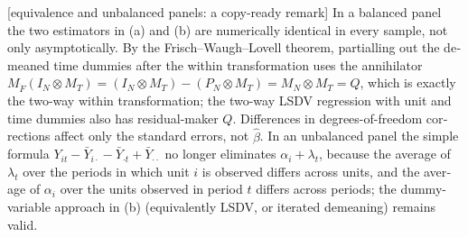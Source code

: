 \begin{english}[equivalence and unbalanced panels: a copy-ready remark]
In a balanced panel the two estimators in (a) and (b) are numerically identical in every sample, not only asymptotically. By the Frisch--Waugh--Lovell theorem, partialling out the demeaned time dummies after the within transformation uses the annihilator $M_{\dot F}(I_N\otimes M_T)=(I_N\otimes M_T)-(P_N\otimes M_T)=M_N\otimes M_T=Q$, which is exactly the two-way within transformation; the two-way LSDV regression with unit and time dummies also has residual-maker $Q$. Differences in degrees-of-freedom corrections affect only the standard errors, not $\hat\beta$. In an unbalanced panel the simple formula $Y_{it}-\bar Y_{i\cdot}-\bar Y_{\cdot t}+\bar Y_{\cdot\cdot}$ no longer eliminates $\alpha_i+\lambda_t$, because the average of $\lambda_t$ over the periods in which unit $i$ is observed differs across units, and the average of $\alpha_i$ over the units observed in period $t$ differs across periods; the dummy-variable approach in (b) (equivalently LSDV, or iterated demeaning) remains valid.
\end{english}
